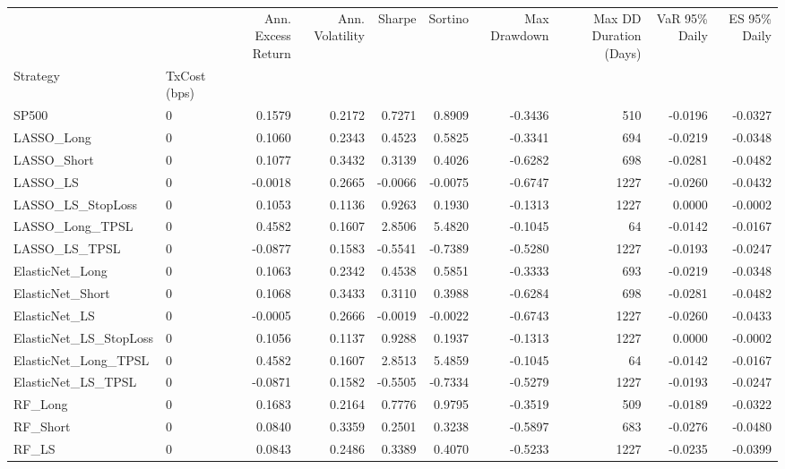 \begin{tabular}{llrrrrrrrr}
\toprule
 &  & Ann. Excess Return & Ann. Volatility & Sharpe & Sortino & Max Drawdown & Max DD Duration (Days) & VaR 95\% Daily & ES 95\% Daily \\
Strategy & TxCost (bps) &  &  &  &  &  &  &  &  \\
\midrule
SP500 & 0 & 0.1579 & 0.2172 & 0.7271 & 0.8909 & -0.3436 & 510 & -0.0196 & -0.0327 \\
\cline{1-10}
LASSO\_Long & 0 & 0.1060 & 0.2343 & 0.4523 & 0.5825 & -0.3341 & 694 & -0.0219 & -0.0348 \\
\cline{1-10}
LASSO\_Short & 0 & 0.1077 & 0.3432 & 0.3139 & 0.4026 & -0.6282 & 698 & -0.0281 & -0.0482 \\
\cline{1-10}
LASSO\_LS & 0 & -0.0018 & 0.2665 & -0.0066 & -0.0075 & -0.6747 & 1227 & -0.0260 & -0.0432 \\
\cline{1-10}
LASSO\_LS\_StopLoss & 0 & 0.1053 & 0.1136 & 0.9263 & 0.1930 & -0.1313 & 1227 & 0.0000 & -0.0002 \\
\cline{1-10}
LASSO\_Long\_TPSL & 0 & 0.4582 & 0.1607 & 2.8506 & 5.4820 & -0.1045 & 64 & -0.0142 & -0.0167 \\
\cline{1-10}
LASSO\_LS\_TPSL & 0 & -0.0877 & 0.1583 & -0.5541 & -0.7389 & -0.5280 & 1227 & -0.0193 & -0.0247 \\
\cline{1-10}
ElasticNet\_Long & 0 & 0.1063 & 0.2342 & 0.4538 & 0.5851 & -0.3333 & 693 & -0.0219 & -0.0348 \\
\cline{1-10}
ElasticNet\_Short & 0 & 0.1068 & 0.3433 & 0.3110 & 0.3988 & -0.6284 & 698 & -0.0281 & -0.0482 \\
\cline{1-10}
ElasticNet\_LS & 0 & -0.0005 & 0.2666 & -0.0019 & -0.0022 & -0.6743 & 1227 & -0.0260 & -0.0433 \\
\cline{1-10}
ElasticNet\_LS\_StopLoss & 0 & 0.1056 & 0.1137 & 0.9288 & 0.1937 & -0.1313 & 1227 & 0.0000 & -0.0002 \\
\cline{1-10}
ElasticNet\_Long\_TPSL & 0 & 0.4582 & 0.1607 & 2.8513 & 5.4859 & -0.1045 & 64 & -0.0142 & -0.0167 \\
\cline{1-10}
ElasticNet\_LS\_TPSL & 0 & -0.0871 & 0.1582 & -0.5505 & -0.7334 & -0.5279 & 1227 & -0.0193 & -0.0247 \\
\cline{1-10}
RF\_Long & 0 & 0.1683 & 0.2164 & 0.7776 & 0.9795 & -0.3519 & 509 & -0.0189 & -0.0322 \\
\cline{1-10}
RF\_Short & 0 & 0.0840 & 0.3359 & 0.2501 & 0.3238 & -0.5897 & 683 & -0.0276 & -0.0480 \\
\cline{1-10}
RF\_LS & 0 & 0.0843 & 0.2486 & 0.3389 & 0.4070 & -0.5233 & 1227 & -0.0235 & -0.0399 \\

\end{tabular}
